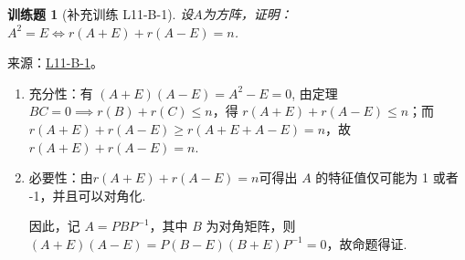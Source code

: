 \documentclass[12pt,fontset=fandol]{ctexart}
\newtheorem{exercise}{训练题}[section]
\begin{document}
\begin{exercise}[补充训练 L11-B-1]\label{prob:L11-B-1}
设$A$为方阵，证明：$A^2=E \iff r(A+E)+r(A-E)=n$.
\end{exercise}
\noindent 来源：\href{https://github.com/yhwu-is/Linear-Algebra-Left-Undone/blob/new/%E8%AE%B2%E4%B9%89/%E4%B8%93%E9%A2%98/11%20%E6%9C%9D%E8%8A%B1%E5%A4%95%E6%8B%BE.tex}{L11-B-1}。
\begin{solve}
\begin{enumerate}
            \item 充分性：有 $(A+E)(A-E) = A^2 - E = 0$, 由定理 $BC=0 \implies r(B)+r(C) \leqslant n$，得 $r(A+E)+r(A-E) \leqslant n$；而 $r(A+E)+r(A-E) \geqslant r(A+E+A-E) = n$，故 $r(A+E)+r(A-E)=n$.
            \item 必要性：由$r(A+E)+r(A-E)=n$可得出 $A$ 的特征值仅可能为 1 或者 -1，并且可以对角化.

                因此，记 $A = PBP^{-1}$，其中 $B$ 为对角矩阵，则 $(A+E)(A-E)=P(B-E)(B+E)P^{-1}=0$，故命题得证.
        \end{enumerate}
\end{solve}
\end{document}
